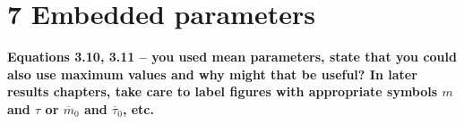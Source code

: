 \documentclass[12pt]{article}
\begin{document}
\section*{7 Embedded parameters}
\textbf{
Equations 3.10, 3.11 -- you used mean parameters,
state that you could also use maximum values and why 
might that be useful?
In later results chapters, take care to label figures
with appropriate symbols $m$ and $\tau$ or 
$\overline{m}_0$ and $\overline{\tau}_0$, etc.
}


%
\end{document}
